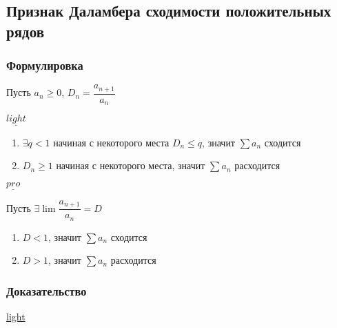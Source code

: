\documentclass[../main.tex]{subfiles}
\begin{document}
\subsection{Признак Даламбера сходимости положительных рядов}
\subsubsection*{Формулировка}
        
            Пусть $a_n \geq 0$, $D_n = \dfrac{a_{n + 1}}{a_n}$
            
            $\underline{light}$
            
            \begin{enumerate}
            
                \item $\exists q < 1$ начиная с некоторого места $D_n \leq q$, значит $\sum a_n$ сходится
                
                \item $D_n \geq 1$ начиная с некоторого места, значит $\sum a_n$ расходится
                
            \end{enumerate}
            
            $\underline{pro}$
            
            Пусть $\exists \lim \dfrac{a_{n + 1}}{a_n} = D$
            
            \begin{enumerate}
            
                \item $D < 1$, значит $\sum a_n$ сходится
                
                \item $D > 1$, значит $\sum a_n$ расходится
                
            \end{enumerate}
    
        \subsubsection*{Доказательство}
        
            \underline{light}
            
\end{document}
